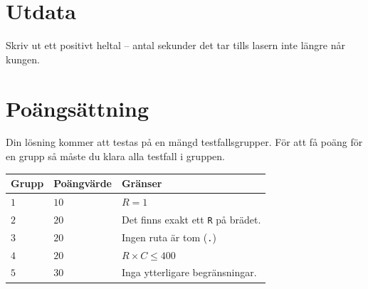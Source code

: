 \section*{Utdata}
Skriv ut ett positivt heltal -- antal sekunder det tar tills lasern inte längre når kungen.

\section*{Poängsättning}
Din lösning kommer att testas på en mängd testfallsgrupper.
För att få poäng för en grupp så måste du klara alla testfall i gruppen.

\noindent
\begin{tabular}{| l | l | l |}
\hline
Grupp & Poängvärde & Gränser \\ \hline
$1$    & $10$       &  $R=1$ \\ \hline
$2$    & $20$       &  Det finns exakt ett \texttt{R} på brädet. \\ \hline
$3$    & $20$       &  Ingen ruta är tom (\texttt{.}) \\ \hline
$4$    & $20$       &  $R\times C \leq 400$ \\ \hline
$5$    & $30$       &  Inga ytterligare begränsningar. \\ \hline
\end{tabular}

